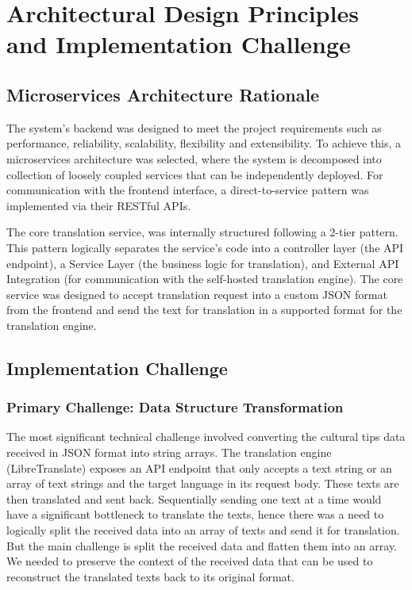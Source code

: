 \section{Architectural Design Principles and Implementation Challenge}

\subsection{Microservices Architecture Rationale}

The system's backend was designed to meet the project requirements such as performance, reliability, scalability, flexibility and extensibility. To achieve this, a microservices architecture was selected, where the system is decomposed into collection of loosely coupled services that can be independently deployed\cite{newman2021building}. For communication with the frontend interface, a direct-to-service pattern was implemented via their RESTful APIs.

The core translation service, was internally structured following a 2-tier pattern\cite{fowler2002patterns}. This pattern logically separates the service's code into a controller layer (the API endpoint), a Service Layer (the business logic for translation), and External API Integration (for communication with the self-hosted translation engine). The core service was designed to accept translation request into a custom JSON format from the frontend and send the text for translation in a supported format for the translation engine.

\subsection{Implementation Challenge}

\subsubsection{Primary Challenge: Data Structure Transformation}

The most significant technical challenge involved converting the cultural tips data received in JSON format into string arrays. The translation engine (LibreTranslate) exposes an API endpoint that only accepts a text string or an array of text strings and the target language in its request body. These texts are then translated and sent back. Sequentially sending one text at a time would have a significant bottleneck to translate the texts, hence there was a need to logically split the received data into an array of texts and send it for translation. But the main challenge is split the received data and flatten them into an array. We needed to preserve the context of the received data that can be used to reconstruct the translated texts back to its original format.

